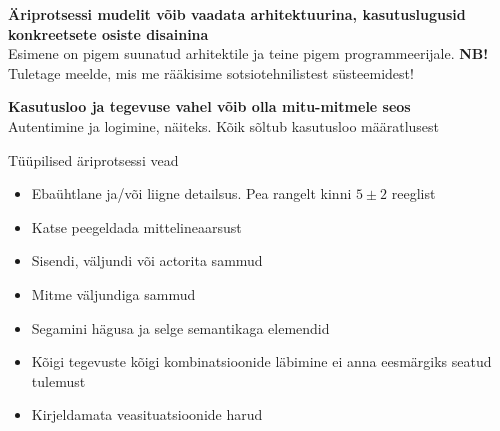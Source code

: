 \documentclass{beamer}
\begin{document}
\begin{frame}[fragile]
	\begin{center}
		\LARGE{\textbf{Äriprotsessi mudelit võib vaadata arhitektuurina, kasutuslugusid konkreetsete osiste disainina}}
		\\[4cm]
		\small{Esimene on pigem suunatud arhitektile ja teine pigem programmeerijale. \textbf{NB!} Tuletage meelde, mis me rääkisime sotsiotehnilistest süsteemidest!}
	\end{center}
\end{frame}

\begin{frame}[fragile]
	\begin{center}
		\LARGE{\textbf{Kasutusloo ja tegevuse vahel võib olla mitu-mitmele seos}}
		\\[4cm]
		\small{Autentimine ja logimine, näiteks. Kõik sõltub kasutusloo määratlusest}
	\end{center}
\end{frame}


\begin{frame}{Tüüpilised äriprotsessi vead}
		\begin{itemize}
			\item Ebaühtlane ja/või liigne detailsus. Pea rangelt kinni $5\pm2$ reeglist
			\item Katse peegeldada mittelineaarsust
			\item Sisendi, väljundi või actorita sammud
			\item Mitme väljundiga sammud
			\item Segamini hägusa ja selge semantikaga elemendid 
			\item Kõigi tegevuste kõigi kombinatsioonide läbimine ei anna eesmärgiks seatud tulemust
			\item Kirjeldamata veasituatsioonide harud
		\end{itemize}
\end{frame}
\end{document}
